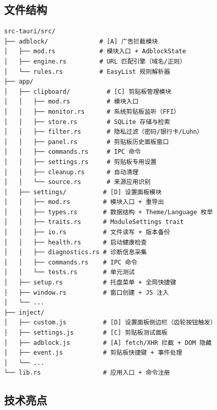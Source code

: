\documentclass[12pt,a4paper]{ctexart}
\begin{document}
\subsection{文件结构}

\begin{lstlisting}[caption=Pake Plus 代码结构]
src-tauri/src/
├── adblock/              # [A] 广告拦截模块
│   ├── mod.rs            # 模块入口 + AdblockState
│   ├── engine.rs         # URL 匹配引擎（域名/正则）
│   └── rules.rs          # EasyList 规则解析器
├── app/
│   ├── clipboard/          # [C] 剪贴板管理模块
│   │   ├── mod.rs          # 模块入口
│   │   ├── monitor.rs      # 系统剪贴板监听（FFI）
│   │   ├── store.rs        # SQLite 存储与检索
│   │   ├── filter.rs       # 隐私过滤（密码/银行卡/Luhn）
│   │   ├── panel.rs        # 剪贴板历史面板窗口
│   │   ├── commands.rs     # IPC 命令
│   │   ├── settings.rs     # 剪贴板专用设置
│   │   ├── cleanup.rs      # 自动清理
│   │   └── source.rs       # 来源应用识别
│   ├── settings/          # [D] 设置面板模块
│   │   ├── mod.rs         # 模块入口 + 重导出
│   │   ├── types.rs       # 数据结构 + Theme/Language 枚举
│   │   ├── traits.rs      # ModuleSettings trait
│   │   ├── io.rs          # 文件读写 + 版本备份
│   │   ├── health.rs      # 启动健康检查
│   │   ├── diagnostics.rs # 诊断信息采集
│   │   ├── commands.rs    # IPC 命令
│   │   └── tests.rs       # 单元测试
│   ├── setup.rs           # 托盘菜单 + 全局快捷键
│   ├── window.rs          # 窗口创建 + JS 注入
│   └── ...
├── inject/
│   ├── custom.js          # [D] 设置面板侧边栏（齿轮按钮触发）
│   ├── settings.js        # [C] 剪贴板测试面板
│   ├── adblock.js         # [A] fetch/XHR 拦截 + DOM 隐藏
│   ├── event.js           # 剪贴板快捷键 + 事件处理
│   └── ...
└── lib.rs                 # 应用入口 + 命令注册
\end{lstlisting}

\subsection{技术亮点}
\end{document}
